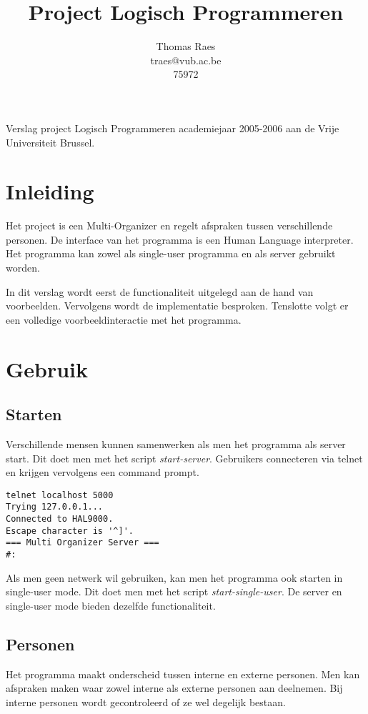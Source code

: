 \documentclass[a4paper]{article}
\begin{document}
\title{Project Logisch Programmeren}
\author{Thomas Raes \\ traes@vub.ac.be \\ 75972}

\maketitle

\abstract
Verslag project Logisch Programmeren academiejaar 2005-2006 aan de Vrije Universiteit Brussel.

\tableofcontents

\section{Inleiding}
Het project is een Multi-Organizer en regelt afspraken tussen verschillende personen.
De interface van het programma is een Human Language interpreter.
Het programma kan zowel als single-user programma en als server gebruikt worden.

In dit verslag wordt eerst de functionaliteit uitgelegd aan de hand van voorbeelden.
Vervolgens wordt de implementatie besproken.
Tenslotte volgt er een volledige voorbeeldinteractie met het programma.

\section{Gebruik}

\subsection{Starten}
Verschillende mensen kunnen samenwerken als men het programma als server start.
Dit doet men met het script {\em start-server}.
Gebruikers connecteren via telnet en krijgen vervolgens een command prompt.

\begin{verbatim}
telnet localhost 5000
Trying 127.0.0.1...
Connected to HAL9000.
Escape character is '^]'.
=== Multi Organizer Server ===
#:
\end{verbatim}

Als men geen netwerk wil gebruiken, kan men het programma ook starten in single-user mode.
Dit doet men met het script {\em start-single-user}.
De server en single-user mode bieden dezelfde functionaliteit.

\subsection{Personen}
Het programma maakt onderscheid tussen interne en externe personen.
Men kan afspraken maken waar zowel interne als externe personen aan deelnemen.
Bij interne personen wordt gecontroleerd of ze wel degelijk bestaan.
\end{document}
